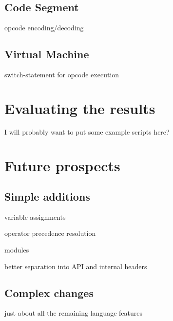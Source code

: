     \section{Code Segment}
        
        opcode encoding/decoding
        
    \section{Virtual Machine}
        
        switch-statement for opcode execution

\chapter{Evaluating the results}

I will probably want to put some example scripts here?

\chapter{Future prospects}

    \section{Simple additions}
        
        variable assignments
        
        operator precedence resolution
        
        modules
        
        better separation into API and internal headers
    
    \section{Complex changes}
        
        just about all the remaining language features
